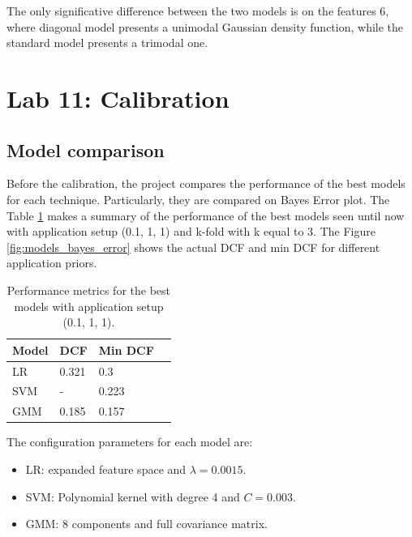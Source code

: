 \documentclass{article}
\begin{document}
The only significative difference between the two models is on the features 6, where diagonal model presents a unimodal Gaussian density function, while the standard model presents a trimodal one. 

\section{Lab 11: Calibration}

\subsection{Model comparison}
Before the calibration, the project compares the performance of the best models for each technique. Particularly, they are compared on Bayes Error plot. The Table \ref{tab:models_performance} makes a summary of the performance of the best models seen until now with application setup (0.1, 1, 1) and k-fold with k equal to 3. The Figure \ref{fig:models_bayes_error} shows the actual DCF and min DCF for different application priors.

\begin{table}[ht]
    \centering
    \begin{tabularx}{\textwidth}{lXXX}
        \toprule
        \textbf{Model} & \textbf{DCF} & \textbf{Min DCF} \\
        \midrule
        LR & 0.321 & 0.3 \\
        SVM & - & 0.223 \\
        GMM & 0.185 & 0.157 \\
        \bottomrule
    \end{tabularx}
    \caption{Performance metrics for the best models with application setup (0.1, 1, 1).}
    \label{tab:models_performance}
\end{table}

The configuration parameters for each model are:
\begin{itemize}
    \item LR: expanded feature space and $\lambda = 0.0015$.
    \item SVM: Polynomial kernel with degree 4 and $C = 0.003$.
    \item GMM: 8 components and full covariance matrix.
\end{itemize}
\end{document}
